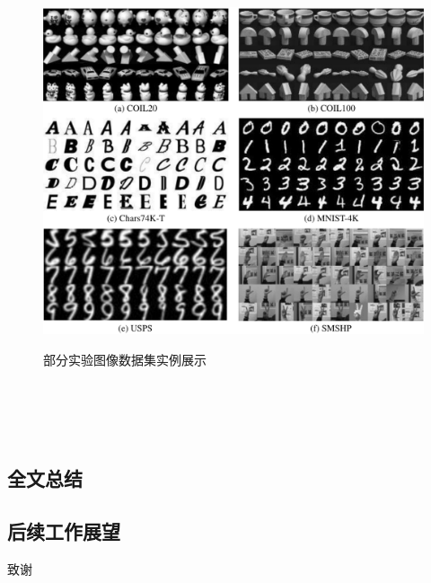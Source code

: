 \documentclass[doctor]{thesis}
\begin{document}
\begin{figure}[!t]
    \centering
    \includegraphics[width=16.5cm]{./figs/fig_data_visualization.pdf}\\
    \caption{部分实验图像数据集实例展示}
    \label{chapter_sgae_data_visualization}
\end{figure}








\thesisChapterConclusion
\chapter{~~~~~}

\section{全文总结}



\section{后续工作展望}




\begin{thesisAcknowledgement}
 致谢
\end{thesisAcknowledgement}
\end{document}
